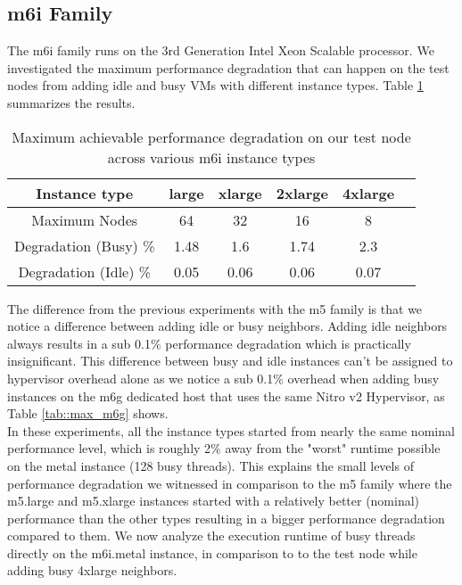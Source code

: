 \subsection{m6i Family}
The m6i family runs on the 3rd Generation Intel Xeon Scalable 
processor. We investigated the maximum performance degradation that can happen on the test nodes 
from adding idle and busy VMs with different instance types. Table \ref{tab::max_m6i} summarizes
the results.
\begin{table}[H]
\begin{center}
\begin{tabular}{ |c|c|c|c|c|c }
 Instance type & large & xlarge & 2xlarge & 4xlarge \\
 \hline
 Maximum Nodes & 64 & 32 & 16 & 8  \\
 \hline
Degradation (Busy) \% & 1.48 & 1.6 & 1.74 & 2.3  \\ 
\hline 
Degradation (Idle) \% & 0.05 & 0.06 & 0.06 & 0.07  \\ 
\end{tabular}
\end{center}
\caption{Maximum achievable performance degradation on our test node across various m6i instance types}
\label{tab::max_m6i}
\end{table}
\noindent
The difference from the previous experiments with the m5 family is that we notice a difference between 
adding idle or busy neighbors. Adding idle neighbors always results in a sub 0.1\% performance 
degradation which is practically insignificant. This difference between busy and idle instances can't be 
assigned to hypervisor overhead alone as we notice a sub 0.1\% overhead when adding busy instances
on the m6g dedicated host that uses the same Nitro v2 Hypervisor, as Table \ref{tab::max_m6g} shows.\\
In these experiments, all the instance types started from nearly the same nominal performance 
level, which is roughly 2\% away from the "worst" runtime possible on the metal instance (128 busy 
threads). This explains the small levels of performance degradation we witnessed in comparison to the m5 family 
where the m5.large and m5.xlarge instances started with a relatively better (nominal) performance than 
the other types resulting in a bigger performance degradation compared to them. 
We now analyze the execution runtime of busy threads directly on the m6i.metal instance, in comparison
to to the test node while adding busy 4xlarge neighbors. 
